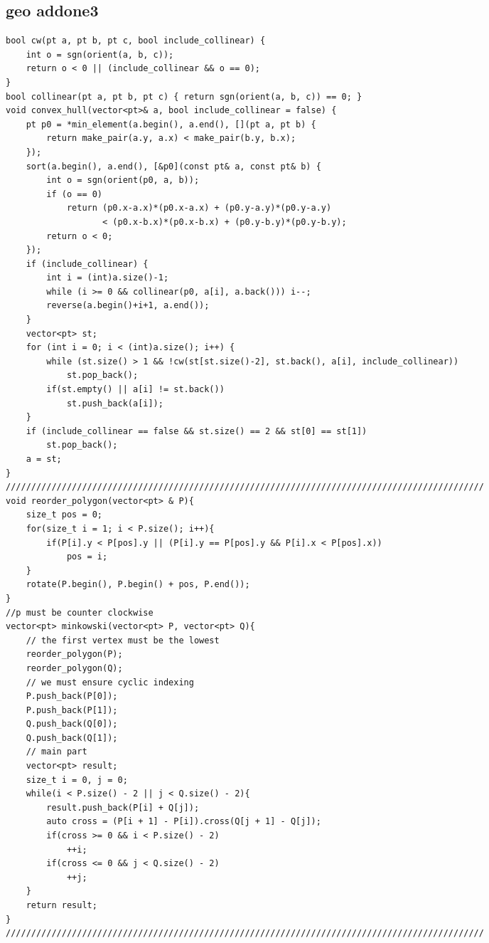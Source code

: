 \documentclass[twoside]{article}
\begin{document}
\begin{multicols*}{2}
{\subsection*{geo addone3}
}
\begin{verbatim}
bool cw(pt a, pt b, pt c, bool include_collinear) {
    int o = sgn(orient(a, b, c));
    return o < 0 || (include_collinear && o == 0);
}
bool collinear(pt a, pt b, pt c) { return sgn(orient(a, b, c)) == 0; }
void convex_hull(vector<pt>& a, bool include_collinear = false) {
    pt p0 = *min_element(a.begin(), a.end(), [](pt a, pt b) {
        return make_pair(a.y, a.x) < make_pair(b.y, b.x);
    });
    sort(a.begin(), a.end(), [&p0](const pt& a, const pt& b) {
        int o = sgn(orient(p0, a, b));
        if (o == 0)
            return (p0.x-a.x)*(p0.x-a.x) + (p0.y-a.y)*(p0.y-a.y)
                   < (p0.x-b.x)*(p0.x-b.x) + (p0.y-b.y)*(p0.y-b.y);
        return o < 0;
    });
    if (include_collinear) {
        int i = (int)a.size()-1;
        while (i >= 0 && collinear(p0, a[i], a.back())) i--;
        reverse(a.begin()+i+1, a.end());
    }
    vector<pt> st;
    for (int i = 0; i < (int)a.size(); i++) {
        while (st.size() > 1 && !cw(st[st.size()-2], st.back(), a[i], include_collinear))
            st.pop_back();
        if(st.empty() || a[i] != st.back())
            st.push_back(a[i]);
    }
    if (include_collinear == false && st.size() == 2 && st[0] == st[1])
        st.pop_back();
    a = st;
}
//////////////////////////////////////////////////////////////////////////////////////////////
void reorder_polygon(vector<pt> & P){
    size_t pos = 0;
    for(size_t i = 1; i < P.size(); i++){
        if(P[i].y < P[pos].y || (P[i].y == P[pos].y && P[i].x < P[pos].x))
            pos = i;
    }
    rotate(P.begin(), P.begin() + pos, P.end());
}
//p must be counter clockwise
vector<pt> minkowski(vector<pt> P, vector<pt> Q){
    // the first vertex must be the lowest
    reorder_polygon(P);
    reorder_polygon(Q);
    // we must ensure cyclic indexing
    P.push_back(P[0]);
    P.push_back(P[1]);
    Q.push_back(Q[0]);
    Q.push_back(Q[1]);
    // main part
    vector<pt> result;
    size_t i = 0, j = 0;
    while(i < P.size() - 2 || j < Q.size() - 2){
        result.push_back(P[i] + Q[j]);
        auto cross = (P[i + 1] - P[i]).cross(Q[j + 1] - Q[j]);
        if(cross >= 0 && i < P.size() - 2)
            ++i;
        if(cross <= 0 && j < Q.size() - 2)
            ++j;
    }
    return result;
}
//////////////////////////////////////////////////////////////////////////////////////////////

\end{verbatim}
\end{multicols*}
\end{document}
